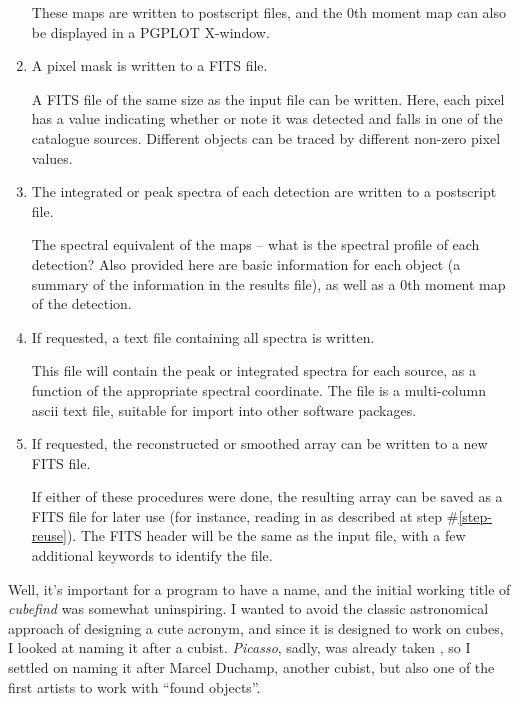 \begin{enumerate}
  These maps are written to postscript files, and the 0th moment map
  can also be displayed in a PGPLOT X-window.

\item A pixel mask is written to a FITS file.

  A FITS file of the same size as the input file can be written. Here,
  each pixel has a value indicating whether or note it was detected
  and falls in one of the catalogue sources. Different objects can be
  traced by different non-zero pixel values.

\item The integrated or peak spectra of each detection are written to a
  postscript file. 

  The spectral equivalent of the maps -- what is the spectral profile
  of each detection? Also provided here are basic information for each
  object (a summary of the information in the results file), as well
  as a 0th moment map of the detection.

\item If requested, a text file containing all spectra is written.

  This file will contain the peak or integrated spectra for each
  source, as a function of the appropriate spectral coordinate. The
  file is a multi-column ascii text file, suitable for import into
  other software packages. 

\item If requested, the reconstructed or smoothed array can be written
  to a new FITS file.

  If either of these procedures were done, the resulting array can be
  saved as a FITS file for later use (for instance, reading in as
  described at step \#\ref{step-reuse}). The FITS header will be the
  same as the input file, with a few additional keywords to identify
  the file.

\end{enumerate}


Well, it's important for a program to have a name, and the initial
working title of \emph{cubefind} was somewhat uninspiring. I wanted to
avoid the classic astronomical approach of designing a cute acronym,
and since it is designed to work on cubes, I looked at naming it after
a cubist. \emph{Picasso}, sadly, was already taken \citep{minchin99},
so I settled on naming it after Marcel Duchamp, another cubist, but
also one of the first artists to work with ``found objects''.

